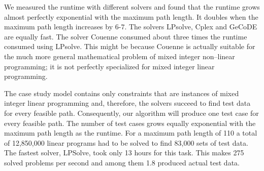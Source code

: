 \documentclass[runningheads,a4paper]{llncs}%
\begin{document}
We measured the runtime with different solvers and found that the runtime grows
almost perfectly exponential with the maximum path length. It doubles when the
maximum path length increases by $6$-$7$. The solvers LPsolve, Cplex and GeCoDE
are equally fast. The solver Couenne consumed about three times the runtime
consumed using LPsolve. This might be because Couenne is actually suitable for
the much more general mathematical problem of mixed integer non--linear
programming; it is not perfectly specialized for mixed integer linear
programming.

The case study model contains only constraints that are instances of mixed
integer linear programming and, therefore, the solvers succeed to find test data
for every feasible path. Consequently, our algorithm will produce one test case
for every feasible path. The number of test cases grows equally exponential with
the maximum path length as the runtime. For a maximum path length of 110 a total
of 12,850,000 linear programs had to be solved to find 83,000 sets of test data.
The fastest solver, LPSolve, took only 13 hours for this task. This makes 275
solved problems per second and among them 1.8 produced actual test data.
\end{document}
